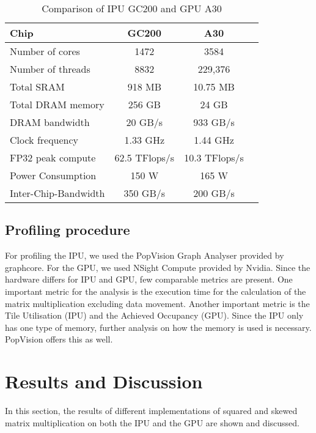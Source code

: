 \documentclass[a4paper,UKenglish,cleveref, autoref, thm-restate]{oasics-v2021}
\begin{document}
\begin{table}
	\centering
	\caption{Comparison of IPU GC200 and GPU A30}
	\begin{tabular}{|l|c|c|c} 
		\hline
		Chip & GC200 & A30 \\
		\hline
		Number of cores     & 1472 	& 3584 \\
		Number of threads   & 8832 & 229,376 \\
		Total SRAM          & 918 MB & 10.75 MB \\
		Total DRAM memory    & 256 GB & 24 GB \\
		DRAM bandwidth         & 20 GB/s & 933 GB/s \\
		Clock frequency     & 1.33 GHz & 1.44 GHz \\
		FP32 peak compute     & 62.5 TFlops/s    & 10.3 TFlops/s \\
		Power Consumption      & 150 W & 165 W \\
		Inter-Chip-Bandwidth & 350 GB/s & 200 GB/s \\
		
		\hline
	\end{tabular}
	\label{table:Arch_diff}
\end{table}

\subsection{Profiling procedure}
For profiling the IPU, we used the PopVision Graph Analyser \cite{popvision} provided by graphcore. For the GPU, we used NSight Compute provided by Nvidia. Since the hardware differs for IPU and GPU, few comparable metrics are present. One important metric for the analysis is the execution time for the calculation of the matrix multiplication excluding data movement. Another important metric is the Tile Utilisation (IPU) and the Achieved Occupancy (GPU). Since the IPU only has one type of memory, further analysis on how the memory is used is necessary. PopVision offers this as well.

\section{Results and Discussion}

In this section, the results of different implementations of squared and skewed matrix multiplication on both the IPU and the GPU are shown and discussed.
\end{document}
